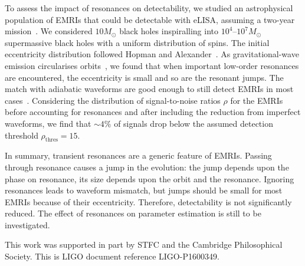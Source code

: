 \documentclass[a4paper]{jpconf}
\begin{document}
To assess the impact of resonances on detectability, we studied an astrophysical population of EMRIs that could be detectable with eLISA, assuming a two-year mission~\cite{Amaro-Seoane2012a}. We considered $10 M_\odot$ black holes inspiralling into $10^4$--$10^7 M_\odot$ supermassive black holes with a uniform distribution of spins. The initial eccentricity distribution followed Hopman and Alexander~\cite{Hopman2005}. As gravitational-wave emission circularises orbits~\cite{Peters1964}, we found that when important low-order resonances are encountered, the eccentricity is small and so are the resonant jumps. The match with adiabatic waveforms are good enough to still detect EMRIs in most cases~\cite{Berry2016a}. Considering the distribution of signal-to-noise ratios $\rho$ for the EMRIs before accounting for resonances and after including the reduction from imperfect waveforms, we find that $\sim4\%$ of signals drop below the assumed detection threshold $\rho_\mathrm{thres} = 15$.



In summary, transient resonances are a generic feature of EMRIs. Passing through resonance causes a jump in the evolution: the jump depends upon the phase on resonance, its size depends upon the orbit and the resonance. Ignoring resonances leads to waveform mismatch, but jumps should be small for most EMRIs because of their eccentricity. Therefore, detectability is not significantly reduced. The effect of resonances on parameter estimation is still to be investigated.

\ack
This work was supported in part by STFC and the Cambridge Philosophical Society. This is LIGO document reference LIGO-P1600349.



\end{document}
